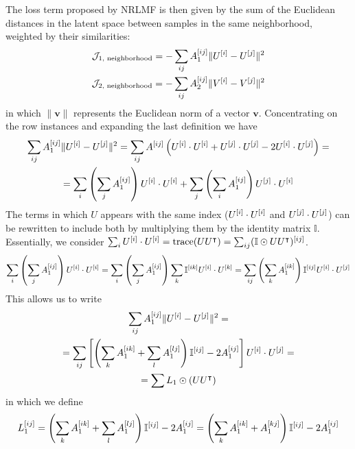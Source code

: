 The loss term proposed by NRLMF is then given by the sum of the Euclidean distances in the latent space between samples in the same neighborhood, weighted by their similarities:
%
\begin{gather}
    \mathcal{J}_\text{1, neighborhood} =
    - \sum_{ij}A_1^{[ij]} \|U^{[i]} - U^{[j]}\|^2
    \\
    \mathcal{J}_\text{2, neighborhood} =
    - \sum_{ij}A_2^{[ij]} \|V^{[i]} - V^{[j]}\|^2
    \label{eq:neighborhood_regularization}
\end{gather}
%
in which $\|\mathbf{v}\|$ represents the Euclidean norm of a vector $\mathbf{v}$.
Concentrating on the row instances and expanding the last definition we have
%
\begin{multline*}
    \sum_{ij}A_1^{[ij]} \|U^{[i]} - U^{[j]}\|^2
    = \sum_{ij} A^{[ij]}
    \left(
        U^{[i]}\cdot U^{[i]} + U^{[j]}\cdot U^{[j]} - 2 U^{[i]}\cdot U^{[j]}
    \right)
    =\\
    =
        \sum_i \left(\sum_j A_1^{[ij]}\right) U^{[i]}\cdot U^{[i]}
        + \sum_j \left(\sum_i A_1^{[ij]}\right) U^{[j]}\cdot U^{[i]}
\end{multline*}
%
The terms in which $U$ appears with the same index ($U^{[i]}\cdot U^{[i]}$ and $U^{[j]}\cdot U^{[j]}$) can be rewritten to include both by multiplying them by the identity matrix $\mathbb{I}$. Essentially, we consider $\sum_i U^{[i]}\cdot U^{[i]} = \text{trace}(U U^\intercal) = \sum_{ij} (\mathbb{I} \odot UU^\intercal)^{[ij]}$.
%
\begin{equation*}
    \sum_i \left(\sum_j A_1^{[ij]}\right) U^{[i]}\cdot U^{[i]}
    = \sum_i \left(\sum_j A_1^{[ij]}\right) \sum_k \mathbb{I}^{[ik]}U^{[i]}\cdot U^{[k]}
    = \sum_{ij} \left(\sum_k A_1^{[ik]}\right) \mathbb{I}^{[ij]} U^{[i]}\cdot U^{[j]}
\end{equation*}
%
This allows us to write
%
\begin{multline*}
    \sum_{ij}A_1^{[ij]} \|U^{[i]} - U^{[j]}\|^2
    =\\
    = \sum_{ij}
        \left[
            \left(\sum_k A_1^{[ik]} + \sum_l A_1^{[lj]}\right)
            \mathbb{I}^{[ij]}
            - 2 A_1^{[ij]} 
        \right]
        U^{[i]}\cdot U^{[j]}
    =\\
    = \sum L_1 \odot (UU^\intercal)
\end{multline*}
%
in which we define
%
\begin{equation}
    L_1^{[ij]}
    = \left(\sum_k A_1^{[ik]} + \sum_l A_1^{[lj]}\right)
        \mathbb{I}^{[ij]}
        - 2 A_1^{[ij]} 
    = \left(\sum_k A_1^{[ik]} + A_1^{[kj]}\right)
        \mathbb{I}^{[ij]}
        - 2 A_1^{[ij]} 
    \label{eq:laplacian}
\end{equation}
